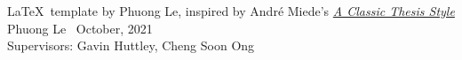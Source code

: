\thispagestyle{empty}

\hfill

\vfill

\LaTeX\ template by 
Phuong Le, inspired by André Miede's \href{http://www.LaTeXTemplates.com}{\textit{A Classic Thesis Style}} \\


Phuong Le \textcopyright\ October, 2021 \\

Supervisors: Gavin Huttley, Cheng Soon Ong

\newpage